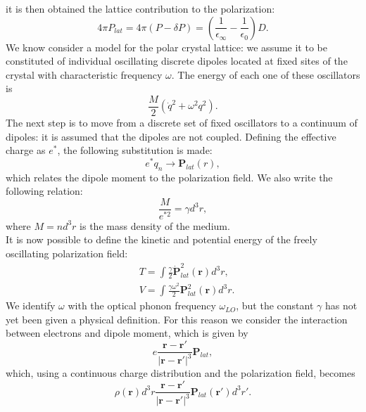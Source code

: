 \documentclass[12pt, a4paper]{report}
\numberwithin{equation}{section}
\begin{document}
it is then obtained the lattice contribution to the polarization:
\begin{equation}
    4\pi P_{lat} = 4\pi(P-\delta P) = \left(\frac{1}{\epsilon_\infty}-\frac{1}{\epsilon_0}\right)D.
    \label{eq_polarization_lattice}
\end{equation}
We know consider a model for the polar crystal lattice: we assume it to be constituted of individual oscillating discrete dipoles 
located at fixed sites of the crystal with characteristic frequency $\omega$. The energy of each one of these oscillators is 
\begin{equation}
    \frac{M}{2}(\dot{q}^2+\omega^2q^2).
\end{equation}
The next step is to move from a discrete set of fixed oscillators to a continuum of dipoles: it is assumed that the dipoles are not 
coupled. Defining the effective charge as $e^*$, the following substitution is made:
\begin{equation}
    e^*q_n\to \mathbf{P}_{lat}(r),
\end{equation}
which relates the dipole moment to the polarization field. We also write the following relation:
\begin{equation}
    \frac{M}{e^{*2}}=\gamma d^3r,
\end{equation}
where $M=nd^3r$ is the mass density of the medium.\\
It is now possible to define the kinetic and potential energy of the freely oscillating polarization field:
\begin{equation}
\begin{split}
    &T=\int \frac{\gamma}{2}\dot{\mathbf{P}}_{lat}^2(\mathbf{r})d^3r,\\
    &V=\int \frac{\gamma\omega^2}{2}\mathbf{P}_{lat}^2(\mathbf{r})d^3r.
\end{split}
\end{equation}
We identify $\omega$ with the optical phonon frequency $\omega_{LO}$, but the constant $\gamma$ has not yet been given a physical 
definition. For this reason we consider the interaction between electrons and dipole moment, which is given by 
\begin{equation}
    e\frac{\mathbf{r}-\mathbf{r}'}{|\mathbf{r}-\mathbf{r}'|^3}\mathbf{P}_{lat},
\end{equation}
which, using a continuous charge distribution and the polarization field, becomes
\begin{equation}
    \rho(\mathbf{r})d^3r\frac{\mathbf{r}-\mathbf{r}'}{|\mathbf{r}-\mathbf{r}'|^3}\mathbf{P}_{lat}(\mathbf{r}')d^3r'.
\end{equation}
\end{document}
